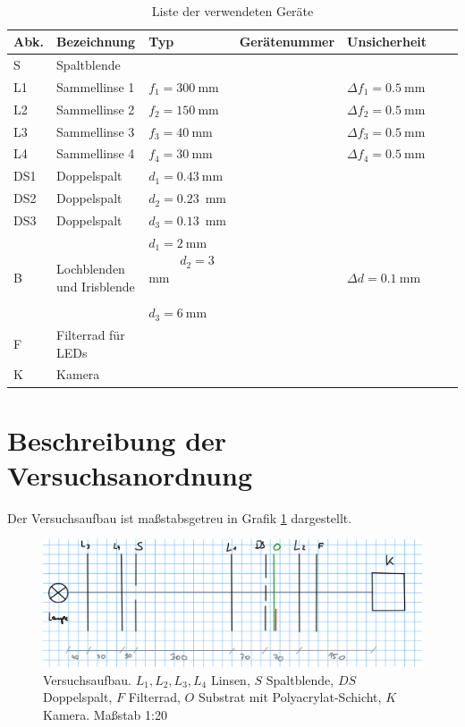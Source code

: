 \documentclass{article}
\begin{document}
\begin{table}[H]
\caption{Liste der verwendeten Geräte}

~

\begin{tabular}{l|p{3cm}p{3cm}llll}
Abk. & Bezeichnung  & Typ & Gerätenummer & Unsicherheit \\
\hline
S & Spaltblende \\
\hline
L1 & Sammellinse 1 & $f_1 = 300~$mm & & $\Delta f_1 = 0.5~$mm \\
\hline
L2 & Sammellinse 2 & $f_2 = 150~$mm & & $\Delta f_2 = 0.5~$mm \\
\hline
L3 & Sammellinse 3 & $f_3 = 40~$mm & & $\Delta f_3 = 0.5~$mm \\
\hline
L4 & Sammellinse 4 & $f_4 = 30~$mm & & $\Delta f_4 = 0.5~$mm \\
\hline
DS1 & Doppelspalt & $d_1=0.43~$mm \\
\hline
DS2 & Doppelspalt & $d_2=0.23$~mm \\
\hline
DS3 & Doppelspalt & $d_3=0.13$~mm\\
\hline





B & Lochblenden und Irisblende & $d_1=2~$mm ~ ~ ~ ~ $d_2=3~$mm   ~~~~~~~~~~~~ $d_3=6~$mm & &  $\Delta d = 0.1~$mm \\
\hline
F & Filterrad für LEDs & \\
\hline
K & Kamera
\end{tabular}

\end{table}



\section{Beschreibung der Versuchsanordnung}

Der Versuchsaufbau ist maßstabsgetreu in Grafik \ref{fig:aufbau} dargestellt.
\begin{figure}[H]
\caption{Versuchsaufbau. $L_1,L_2,L_3,L_4$ Linsen, $S$ Spaltblende, $DS$ Doppelspalt, $F$ Filterrad, $O$ Substrat mit Polyacrylat-Schicht, $K$ Kamera. Maßstab 1:20}
\label{fig:aufbau}
\includegraphics[scale=1]{aufbau.png}
\end{figure}
\end{document}

